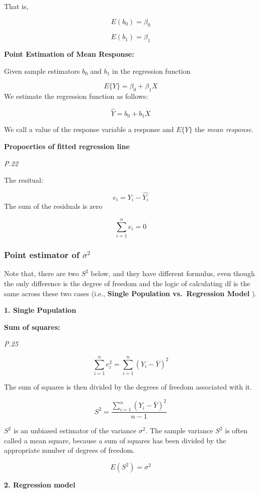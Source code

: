 \documentclass[]{book}
\begin{document}
That is,

\[E(b_0)=\beta_0\]

\[E(b_1)=\beta_1\]

\textbf{Point Estimation of Mean Response:}

Given sample estimators \(b_0\) and \(b_1\) in the regression function

\[E\{Y\}=\beta_0+\beta_1X\]
We estimate the regression function as follows:

\[\hat{Y}=b_0+b_1X\]

We call a value of the response variable a response and \(E\{Y\}\) the \emph{mean response}.

\textbf{Propoerties of fitted regression line}

\emph{P.22}

The resitual:

\[e_i=Y_i-\hat{Y_i}\]
The sum of the residuals is zero

\[\sum_{i=1}^n e_i=0\]

\hypertarget{point-estimator-of-sigma2}{%
\subsubsection{\texorpdfstring{Point estimator of \(\sigma^2\)}{Point estimator of \textbackslash sigma\^{}2}}\label{point-estimator-of-sigma2}}

Note that, there are two \(S^2\) below, and they have different formulus, even though the only difference is the degree of freedom and the logic of calculating df is the same across these two cases (i.e., \textbf{Single Population vs.~Regression Model} ).

\textbf{1. Single Pupulation}

\textbf{Sum of squares:}

\emph{P.25}

\[\sum_{i=1}^ne_i^2=\sum_{i=1}^n (Y_i-\bar{Y})^2\]

The sum of squares is then divided by the degrees of freedom associated with it.

\[S^2= \frac{\sum_{i=1}^n (Y_i-\bar{Y})^2}{n-1}\]

\(S^2\) is an unbiased estimator of the variance \(\sigma^2\). The sample variance \(S^2\) is often called a mean square, because a sum of squares has been divided by the appropriate number of degrees of freedom.

\[E(S^2)=\sigma^2\]

\textbf{2. Regression model}
\end{document}
